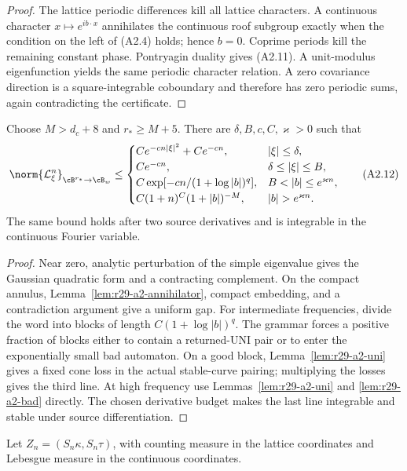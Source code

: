 \begin{proof}
The lattice periodic differences kill all lattice characters.  A continuous
character $x\mapsto e^{ib\cdot x}$ annihilates the continuous roof subgroup
exactly when the condition on the left of (A2.4) holds; hence $b=0$.  Coprime
periods kill the remaining constant phase.  Pontryagin duality gives
(A2.11).  A unit-modulus eigenfunction yields the same periodic character
relation.  A zero covariance direction is a square-integrable coboundary and
therefore has zero periodic sums, again contradicting the certificate.
\end{proof}

\begin{theorem}
\label{thm:r29-a2-fourier}
Choose $M>d_c+8$ and $r_*\ge M+5$.  There are
$\delta,B,c,C,\varkappa>0$ such that
\[
 \norm{\mathcal L_\xi^n}_{\cB^{r_*}\to\cB_w}
 \le
 \begin{cases}
 C e^{-cn|\xi|^2}+Ce^{-cn},&|\xi|\le\delta,\\
 Ce^{-cn},&\delta\le|\xi|\le B,\\
 C\exp[-cn/(1+\log|b|)^q],&B<|b|\le e^{\varkappa n},\\
 C(1+n)^C(1+|b|)^{-M},&|b|>e^{\varkappa n}.
 \end{cases}                                             \tag{A2.12}
\]
The same bound holds after two source derivatives and is integrable in the
continuous Fourier variable.
\end{theorem}

\begin{proof}
Near zero, analytic perturbation of the simple eigenvalue gives the Gaussian
quadratic form and a contracting complement.  On the compact annulus,
Lemma~\ref{lem:r29-a2-annihilator}, compact embedding, and a contradiction
argument give a uniform gap.  For intermediate frequencies, divide the word
into blocks of length $C(1+\log|b|)^q$.  The grammar forces a positive fraction
of blocks either to contain a returned-UNI pair or to enter the exponentially
small bad automaton.  On a good block, Lemma~\ref{lem:r29-a2-uni} gives a fixed
cone loss in the actual stable-curve pairing; multiplying the losses gives the
third line.  At high frequency use Lemmas~\ref{lem:r29-a2-uni} and
\ref{lem:r29-a2-bad} directly.  The chosen derivative budget makes the last
line integrable and stable under source differentiation.
\end{proof}

Let $Z_n=(S_n\kappa,S_n\tau)$, with counting measure in the lattice
coordinates and Lebesgue measure in the continuous coordinates.

